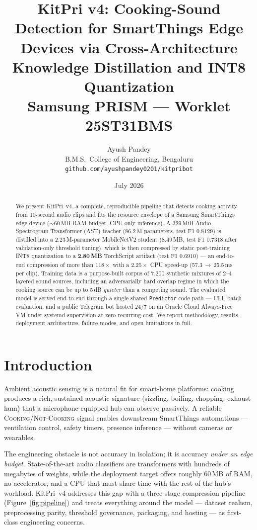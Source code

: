 \documentclass[11pt,a4paper]{article}
\title{\textbf{KitPri v4: Cooking-Sound Detection for SmartThings Edge Devices
via Cross-Architecture Knowledge Distillation and INT8 Quantization}\\[0.6em]
\large Samsung PRISM --- Worklet 25ST31BMS}
\author{Ayush Pandey\\
B.M.S.\ College of Engineering, Bengaluru\\
\texttt{github.com/ayushpandey0201/kitpribot}}
\date{July 2026}
\newcommand{\cooking}{\textsc{Cooking}}
\newcommand{\notcooking}{\textsc{Not-Cooking}}
\begin{document}
\maketitle

\begin{abstract}
\noindent
We present KitPri~v4, a complete, reproducible pipeline that detects cooking
activity from 10-second audio clips and fits the resource envelope of a
Samsung SmartThings edge device ($\sim$60\,MB RAM budget, CPU-only inference).
A 329\,MiB Audio Spectrogram Transformer (AST) teacher (86.2\,M parameters,
test F1 $0.8129$) is distilled into a 2.23\,M-parameter MobileNetV2 student
(8.49\,MB, test F1 $0.7318$ after validation-only threshold tuning), which is
then compressed by static post-training INT8 quantization to a
\textbf{2.80\,MB} TorchScript artifact (test F1 $0.6910$) --- an end-to-end
compression of more than $118\times$ with a $2.25\times$ CPU speed-up
(57.3\,$\rightarrow$\,25.5\,ms per clip). Training data is a purpose-built
corpus of 7{,}200 synthetic mixtures of 2--4 layered sound sources, including
an adversarially hard overlap regime in which the cooking source can be up to
5\,dB \emph{quieter} than a competing sound. The evaluated model is served
end-to-end through a single shared \texttt{Predictor} code path --- CLI, batch
evaluation, and a public Telegram bot hosted 24/7 on an Oracle Cloud
Always-Free VM under systemd supervision at zero recurring cost. We report
methodology, results, deployment architecture, failure modes, and open
limitations in full.
\end{abstract}

\section{Introduction}\label{sec:intro}

Ambient acoustic sensing is a natural fit for smart-home platforms: cooking
produces a rich, sustained acoustic signature (sizzling, boiling, chopping,
exhaust hum) that a microphone-equipped hub can observe passively. A reliable
\cooking{}/\notcooking{} signal enables downstream SmartThings automations ---
ventilation control, safety timers, presence inference --- without cameras or
wearables.

The engineering obstacle is not accuracy in isolation; it is accuracy
\emph{under an edge budget}. State-of-the-art audio classifiers are
transformers with hundreds of megabytes of weights, while the deployment
target offers roughly 60\,MB of RAM, no accelerator, and a CPU that must share
time with the rest of the hub's workload. KitPri~v4 addresses this gap with a
three-stage compression pipeline (Figure~\ref{fig:pipeline}) and treats
everything around the model --- dataset realism, preprocessing parity,
threshold governance, packaging, and hosting --- as first-class engineering
concerns.
\end{document}

